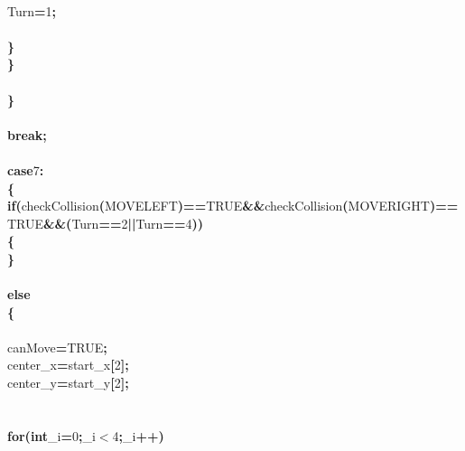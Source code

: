 \documentclass[a4paper, 10pt]{article}
\newcommand\SPC{\hspace*{0.6em}}
\newcommand{\CppAIdentifier}[1]{#1}
\newcommand{\CppANumber}[1]{\textcolor[rgb]{0.5,0,0.5}{#1}}
\newcommand{\CppAReservedWord}[1]{\textbf{#1}}
\newcommand{\CppASpace}[1]{\colorbox[rgb]{1,1,1}{#1}}
\newcommand{\CppASymbol}[1]{\textbf{\textcolor[rgb]{1,0,0}{#1}}}
\begin{document}
\begin{ttfamily}
\\
\CppASpace{\SPC \SPC \SPC \SPC \SPC }\CppAIdentifier{Turn}\CppASpace{\SPC }\CppASymbol{=}\CppASpace{\SPC }\CppANumber{1}\CppASymbol{;}\\
\\
\CppASpace{\SPC \SPC \SPC \SPC }\CppASymbol{\}}\\
\CppASpace{\SPC \SPC \SPC }\CppASymbol{\}}\\
\\
\CppASpace{\SPC \SPC }\CppASymbol{\}}\\
\\
\CppASpace{\SPC \SPC }\CppAReservedWord{break}\CppASymbol{;}\\
\\
\CppASpace{\SPC \SPC }\CppAReservedWord{case}\CppASpace{\SPC }\CppANumber{7}\CppASymbol{:}\\
\CppASpace{\SPC \SPC }\CppASymbol{\{}\\
\CppASpace{\SPC \SPC \SPC }\CppAReservedWord{if}\CppASymbol{(}\CppAIdentifier{checkCollision}\CppASymbol{(}\CppAIdentifier{MOVELEFT}\CppASymbol{)}\CppASymbol{==}\CppAIdentifier{TRUE}\CppASymbol{\&\&}\CppAIdentifier{checkCollision}\CppASymbol{(}\CppAIdentifier{MOVERIGHT}\CppASymbol{)}\CppASymbol{==}\CppAIdentifier{TRUE}\CppASymbol{\&\&}\CppASymbol{(}\CppAIdentifier{Turn}\CppASymbol{==}\CppANumber{2}\CppASymbol{||}\CppAIdentifier{Turn}\CppASymbol{==}\CppANumber{4}\CppASymbol{)}\CppASymbol{)}\\
\CppASpace{\SPC \SPC \SPC }\CppASymbol{\{}\\
\CppASpace{\SPC \SPC \SPC }\CppASymbol{\}}\\
\\
\CppASpace{\SPC \SPC \SPC }\CppAReservedWord{else}\\
\CppASpace{\SPC \SPC \SPC }\CppASymbol{\{}\\
\\
\CppASpace{\SPC \SPC \SPC \SPC }\CppAIdentifier{canMove}\CppASymbol{=}\CppAIdentifier{TRUE}\CppASymbol{;}\\
\CppASpace{\SPC \SPC \SPC \SPC }\CppAIdentifier{center\_x}\CppASymbol{=}\CppAIdentifier{start\_x}\CppASymbol{[}\CppANumber{2}\CppASymbol{]}\CppASymbol{;}\\
\CppASpace{\SPC \SPC \SPC \SPC }\CppAIdentifier{center\_y}\CppASymbol{=}\CppAIdentifier{start\_y}\CppASymbol{[}\CppANumber{2}\CppASymbol{]}\CppASymbol{;}\\
\\
\\
\CppASpace{\SPC \SPC \SPC \SPC }\CppAReservedWord{for}\CppASymbol{(}\CppAReservedWord{int}\CppASpace{\SPC }\CppAIdentifier{\_i}\CppASymbol{=}\CppANumber{0}\CppASymbol{;}\CppAIdentifier{\_i}\CppASymbol{$<$}\CppANumber{4}\CppASymbol{;}\CppAIdentifier{\_i}\CppASymbol{++}\CppASymbol{)}\\

\end{ttfamily}
\end{document}
